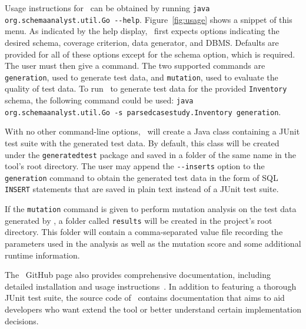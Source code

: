 


Usage instructions for \sa~can be obtained by running \lstinline{java org.schemaanalyst.util.Go --help}.
Figure~\ref{fig:usage} shows a snippet of this menu.  As indicated by the help display, \sa~first expects options
indicating the desired schema, coverage criterion, data generator, and DBMS\@. Defaults are provided for all of these
options except for the schema option, which is required. The user must then give a command.  The two supported commands
are \lstinline{generation}, used to generate test data, and \lstinline{mutation}, used to evaluate the quality of test
data.  To run \sa~to generate test data for the provided \texttt{Inventory} schema, the following command could be used:
\lstinline{java org.schemaanalyst.util.Go -s parsedcasestudy.Inventory generation}.


With no other command-line options, \sa~will create a Java class containing a JUnit test suite with the generated test
data. By default, this class will be created under the \texttt{generatedtest} package and saved in a folder of the same
name in the tool's root directory.  The user may append the \lstinline{--inserts} option to the \lstinline{generation}
command to obtain the generated test data in the form of SQL \texttt{INSERT} statements that are saved in plain text
instead of a JUnit test suite.




If the \lstinline{mutation} command is given to perform mutation analysis on the test data generated by \sa, a folder
called \lstinline{results} will be created in the project's root directory. This folder will contain a comma-separated
value file recording the parameters used in the analysis as well as the mutation score and some additional runtime
information.


The \sa~GitHub page also provides comprehensive documentation, including detailed installation and usage
instructions~\cite{tool}. In addition to featuring a thorough JUnit test suite, the source code of \sa~contains
documentation that aims to aid developers who want extend the tool or better understand certain implementation
decisions.



